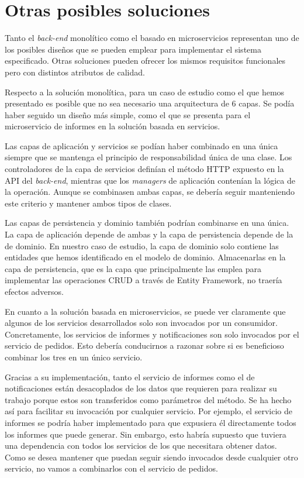 \documentclass[11pt,spanish,listoffigures]{tfgetsinf}
\begin{document}
\section{Otras posibles soluciones}

Tanto el \textit{back-end} monolítico como el basado en microservicios representan uno de los posibles diseños que se pueden emplear para implementar el sistema especificado. Otras soluciones pueden ofrecer los mismos requisitos funcionales pero con distintos atributos de calidad.

Respecto a la solución monolítica, para un caso de estudio como el que hemos presentado es posible que no sea necesario una arquitectura de 6 capas. Se podía haber seguido un diseño más simple, como el que se presenta para el microservicio de informes en la solución basada en servicios. 

Las capas de aplicación y servicios se podían haber combinado en una única siempre que se mantenga el principio de responsabilidad única de una clase. Los controladores de la capa de servicios definían el método HTTP expuesto en la API del \textit{back-end}, mientras que los \textit{managers} de aplicación contenían la lógica de la operación. Aunque se combinasen ambas capas, se debería seguir manteniendo este criterio y mantener ambos tipos de clases.

Las capas de persistencia y dominio también podrían combinarse en una única. La capa de aplicación depende de ambas y la capa de persistencia depende de la de dominio. En nuestro caso de estudio, la capa de dominio solo contiene las entidades que hemos identificado en el modelo de dominio. Almacenarlas en la capa de persistencia, que es la capa que principalmente las emplea para implementar las operaciones CRUD a través de Entity Framework, no traería efectos adversos.

En cuanto a la solución basada en microservicios, se puede ver claramente que algunos de los servicios desarrollados solo son invocados por un consumidor. Concretamente, los servicios de informes y notificaciones son solo invocados por el servicio de pedidos. Esto debería conducirnos a razonar sobre si es beneficioso combinar los tres en un único servicio. 

Gracias a su implementación, tanto el servicio de informes como el de notificaciones están desacoplados de los datos que requieren para realizar su trabajo porque estos son transferidos como parámetros del método. Se ha hecho así para facilitar su invocación por cualquier servicio. Por ejemplo, el servicio de informes se podría haber implementado para que expusiera él directamente todos los informes que puede generar. Sin embargo, esto habría supuesto que tuviera una dependencia con todos los servicios de los que necesitara obtener datos. Como se desea mantener que puedan seguir siendo invocados desde cualquier otro servicio, no vamos a combinarlos con el servicio de pedidos.
\end{document}
